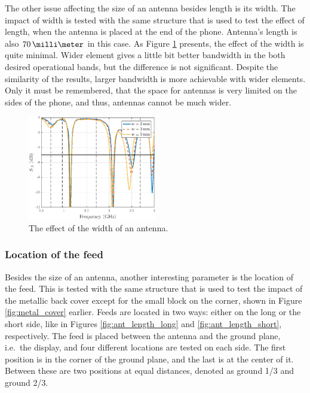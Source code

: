 The other issue affecting the size of an antenna besides length is its width. The impact of width is tested with the same structure that is used to test the effect of length, when the antenna is placed at the end of the phone. Antenna's length is also $70\,\milli\meter$ in this case. As Figure \ref{fig:width_res} presents, the effect of the width is quite minimal. Wider element gives a little bit better bandwidth in the both desired operational bands, but the difference is not significant. Despite the similarity of the results, larger bandwidth is more achievable with wider elements. Only it must be remembered, that the space for antennas is very limited on the sides of the phone, and thus, antennas cannot be much wider.

\begin{figure}[H]
    \centering
    \includegraphics[width=0.50\textwidth]{img/width_res.eps}
    \caption{The effect of the width of an antenna.}
    \label{fig:width_res}
\end{figure}

\subsubsection{Location of the feed}
\label{sec:feed}
Besides the size of an antenna, another interesting parameter is the location of the feed. This is tested with the same structure that is used to test the impact of the metallic back cover except for the small block on the corner, shown in Figure \ref{fig:metal_cover} earlier. Feeds are located in two ways: either on the long or the short side, like in Figures \ref{fig:ant_length_long} and \ref{fig:ant_length_short}, respectively. The feed is placed between the antenna and the ground plane, i.e.\ the display, and four different locations are tested on each side. The first position is in the corner of the ground plane, and the last is at the center of it. Between these are two positions at equal distances, denoted as ground 1/3 and ground 2/3.

